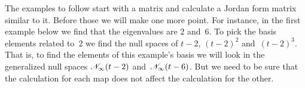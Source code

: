 
The examples to follow start with a matrix and calculate 
a Jordan form matrix similar to it.
Before those we will make one more point.
For instance, in the first example below we find that the eigenvalues are $2$ 
and~$6$. 
To pick the basis elements related to~\( 2\) we find the null spaces of 
$t-2$, \( (t-2)^2 \) and~\( (t-2)^3\). 
That is, to find the elements of this example's basis we will
look in the generalized null spaces $\mathscr{N}_\infty(t-2)$ 
and~$\mathscr{N}_\infty(t-6)$.
But we need to be sure that the calculation for each map does not 
affect the calculation for the other.




